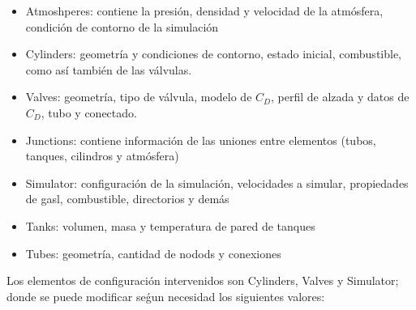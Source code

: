 \begin{itemize}
  \item Atmoshperes: contiene la presión, densidad y velocidad de la atmósfera,
condición de contorno de la simulación
  \item Cylinders: geometría y condiciones de contorno, estado inicial,
combustible, como así también de las válvulas.
  \item Valves: geometría, tipo de válvula, modelo de $C_{D}$, perfil de alzada y
datos de $C_{D}$, tubo y conectado.
  \item Junctions: contiene información de las uniones entre elementos (tubos,
tanques, cilindros y atmósfera)
  \item Simulator: configuración de la simulación, velocidades a simular,
propiedades de gasl, combustible, directorios y demás
  \item Tanks: volumen, masa y temperatura de pared de tanques
  \item Tubes: geometría, cantidad de nodods y conexiones
\end{itemize}

Los elementos de configuración intervenidos son Cylinders, Valves y Simulator;
donde se puede modificar seǵun necesidad los siguientes valores:

